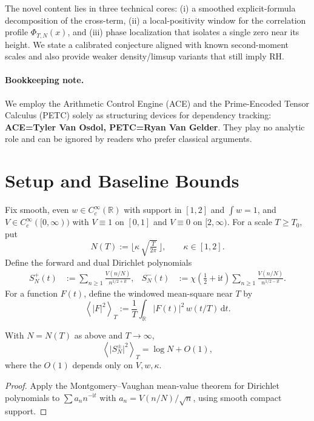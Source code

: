 \documentclass[11pt]{article}
\newcommand{\RR}{\mathbb{R}}
\newcommand{\ii}{\mathrm{i}}
\newcommand{\dd}{\mathrm{d}}
\newcommand{\avg}[1]{\left\langle #1 \right\rangle}
\newcommand{\chiR}{\chi}
\begin{document}
The novel content lies in three technical cores: (i) a smoothed explicit-formula decomposition of the cross-term, (ii) a local-positivity window for the correlation profile $\Phi_{T,N}(x)$, and (iii) phase localization that isolates a single zero near its height. We state a calibrated conjecture aligned with known second-moment scales and also provide weaker density/limsup variants that still imply RH.

\paragraph{Bookkeeping note.} We employ the Arithmetic Control Engine (ACE) and the Prime-Encoded Tensor Calculus (PETC) solely as structuring devices for dependency tracking: \textbf{ACE=Tyler Van Osdol, PETC=Ryan Van Gelder}. They play no analytic role and can be ignored by readers who prefer classical arguments.

\section{Setup and Baseline Bounds}
Fix smooth, even $w\in C_c^\infty(\RR)$ with support in $[1,2]$ and $\int w=1$, and $V\in C_c^\infty([0,\infty))$ with $V\equiv1$ on $[0,1]$ and $V\equiv0$ on $[2,\infty)$.
For a scale $T\ge T_0$, put
\begin{equation}
N(T):=\Big\lfloor \kappa\,\sqrt{\tfrac{T}{2\pi}}\,\Big\rfloor,\qquad \kappa\in[1,2].
\end{equation}
Define the forward and dual Dirichlet polynomials
\begin{align}
S_N^+(t)&:=\sum_{n\ge1}\frac{V(n/N)}{n^{1/2+\ii t}},
&
S_N^-(t)&:=\chiR\!\left(\tfrac12+\ii t\right)\sum_{n\ge1}\frac{V(n/N)}{n^{1/2-\ii t}}.
\end{align}
For a function $F(t)$, define the windowed mean-square near $T$ by
\begin{equation}
\avg{\lvert F\rvert^2}_T:=\frac1T\int_{\RR} \lvert F(t)\rvert^2\, w(t/T)\,\dd t.
\end{equation}

\begin{lemma}\label{lem:baseline}
With $N=N(T)$ as above and $T\to\infty$,
\[
\avg{\lvert S_N^\pm\rvert^2}_T=\log N + O(1),
\]
where the $O(1)$ depends only on $V,w,\kappa$.
\end{lemma}
\begin{proof}
Apply the Montgomery--Vaughan mean-value theorem for Dirichlet polynomials to $\sum a_n n^{-\ii t}$ with $a_n=V(n/N)/\sqrt{n}$, using smooth compact support.
\end{proof}
\end{document}

